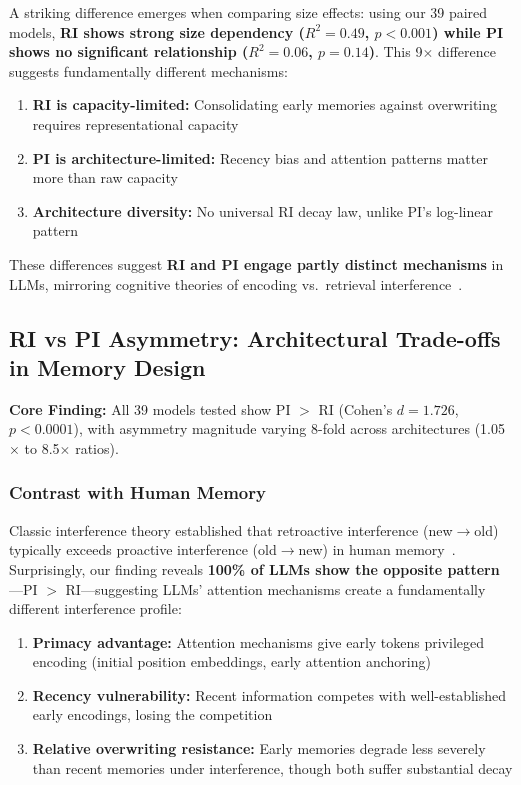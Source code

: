 \documentclass{article}
\begin{document}
A striking difference emerges when comparing size effects: using our 39 paired models, \textbf{RI shows strong size dependency ($R^2 = 0.49$, $p < 0.001$) while PI shows no significant relationship ($R^2 = 0.06$, $p = 0.14$)}. This 9$\times$ difference suggests fundamentally different mechanisms:
\begin{enumerate}
    \item \textbf{RI is capacity-limited:} Consolidating early memories against overwriting requires representational capacity
    \item \textbf{PI is architecture-limited:} Recency bias and attention patterns matter more than raw capacity
    \item \textbf{Architecture diversity:} No universal RI decay law, unlike PI's log-linear pattern
\end{enumerate}

These differences suggest \textbf{RI and PI engage partly distinct mechanisms} in LLMs, mirroring cognitive theories of encoding vs.\ retrieval interference~\citep{underwood1957interference, wixted2004consolidation}.

\subsection{RI vs PI Asymmetry: Architectural Trade-offs in Memory Design}

\textbf{Core Finding:} All 39 models tested show PI $>$ RI (Cohen's $d = 1.726$, $p < 0.0001$), with asymmetry magnitude varying 8-fold across architectures (1.05$\times$ to 8.5$\times$ ratios).

\subsubsection{Contrast with Human Memory}

Classic interference theory established that retroactive interference (new$\rightarrow$old) typically exceeds proactive interference (old$\rightarrow$new) in human memory~\citep{jenkins1924obliviscence, underwood1957interference}. Surprisingly, our finding reveals \textbf{100\% of LLMs show the opposite pattern}---PI $>$ RI---suggesting LLMs' attention mechanisms create a fundamentally different interference profile:

\begin{enumerate}
    \item \textbf{Primacy advantage:} Attention mechanisms give early tokens privileged encoding (initial position embeddings, early attention anchoring)
    \item \textbf{Recency vulnerability:} Recent information competes with well-established early encodings, losing the competition
    \item \textbf{Relative overwriting resistance:} Early memories degrade less severely than recent memories under interference, though both suffer substantial decay
\end{enumerate}
\end{document}

